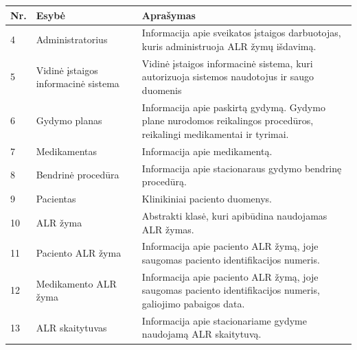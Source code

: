 \begin{table}[ht!]
    \centering
    \renewcommand{\arraystretch}{1.2}
    \renewcommand\thetable{7}

    \begin{tabular}{|m{3em}|m{12em}|m{22em}|}
    \hline 
    \rowcolor[HTML]{EFEFEF} 
    Nr. & Esybė & Aprašymas \\ \hline

    4  &  Administratorius  & Informacija apie sveikatos įstaigos darbuotojas, kuris administruoja ALR žymų išdavimą.       \\ \hline
    5  &  Vidinė įstaigos informacinė sistema  & Vidinė įstaigos informacinė sistema, kuri autorizuoja sistemos naudotojus ir saugo duomenis \\ \hline
    6  &  Gydymo planas  & Informacija apie paskirtą gydymą. Gydymo plane nurodomos reikalingos procedūros, reikalingi medikamentai ir tyrimai.       \\ \hline
    7  &  Medikamentas  & Informacija apie medikamentą.       \\ \hline
    8  &  Bendrinė procedūra  & Informacija apie stacionaraus gydymo bendrinę procedūrą.       \\ \hline
    9  &  Pacientas  & Klinikiniai paciento duomenys.       \\ \hline
    10  &  ALR žyma  & Abstrakti klasė, kuri apibūdina naudojamas ALR žymas.    \\ \hline
    11  &  Paciento ALR žyma  & Informacija apie paciento ALR žymą, joje saugomas paciento identifikacijos numeris.    \\ \hline
    12  &  Medikamento ALR žyma  & Informacija apie paciento ALR žymą, joje saugomas paciento identifikacijos numeris, galiojimo pabaigos data.    \\ \hline
    13  &  ALR skaitytuvas  & Informacija apie stacionariame gydyme naudojamą ALR skaitytuvą. \\ \hline


    \end{tabular}

\end{table}

